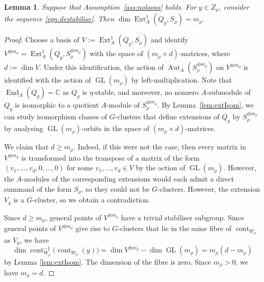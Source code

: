 \documentclass[11pt,reqno]{amsart}
\numberwithin{equation}{section}
\newtheorem{lemma}[theorem]{Lemma}
\theoremstyle{definition}
\newcommand{\CC}{\ensuremath{\mathbb{C}}}
\newcommand{\cont}{\operatorname{cont}}
\newcommand{\End}{\operatorname{End}}
\newcommand{\Ext}{\operatorname{Ext}}
\newcommand{\GL}{\operatorname{GL}}
\newcommand{\0}{\operatorname{0}}
\begin{document}
 \begin{lemma}
 \label{lem:ExtsFor0andII}
 Suppose that Assumption~\ref{ass:noloops} holds. For $y\in Z_\rho$, consider the sequence \eqref{eqn:destabilise}. Then $\dim \Ext^1_A(Q_y,S_\rho)= m_\rho$.     
 \end{lemma}
 \begin{proof}
 Choose a basis of $V:=\Ext_A^1(Q_y,S_\rho)$ and identify 
 $V^{\oplus m_\rho}=\Ext_A^1(Q_y,S_\rho^{\oplus m_\rho})$ with the space of $(m_\rho\times d)$-matrices, where $d:=\dim V$.
 Under this identification, the action of $\operatorname{Aut}_A(S_\rho^{\oplus m_\rho})$ on $V^{\oplus m_\rho}$ is identified with the action of $\GL(m_\rho)$ by left-multiplication. Note that $\End_A(Q_y)=\CC$ as $Q_y$ is $\eta$-stable, and moreover, no nonzero $A$-submodule of $Q_y$ is isomorphic to a quotient $A$-module of $S_\rho^{\oplus m_\rho}$. By Lemma~\ref{lem:extIsom}, we can study isomorphism classes of $G$-clusters that define extensions of $Q_y$ by $S_\rho^{\oplus m_\rho}$ by analysing $\GL(m_\rho)$-orbits in the space of $(m_\rho\times d)$-matrices. 
 
  We claim that $d\geq m_\rho$. Indeed, if this were not the case, then every matrix in $V^{\oplus m_\rho}$ is transformed into the transpose of a matrix of the form $(v_1,\dots,v_d,0,\dots,0)$ for some $v_1, \dots, v_d\in V$ by the action of $\GL(m_\rho)$. However, the $A$-modules of the corresponding extensions would each admit a direct summand of the form $S_\rho$, so they could not be $G$-clusters. However, the extension $V_y$ is a $G$-cluster, so we obtain a contradiction. 
   
  Since $d\ge m_\rho$, general points of $V^{\oplus m_\rho}$ have a trivial stabiliser subgroup. Since general points of $V^{\oplus m_\rho}$ give rise to $G$-clusters that lie in the same fibre of $\cont_{W_\rho}$ as $V_y$, we have
\[
\dim \cont_{W_\rho}^{-1}\big(\cont_{W_\rho}(y)\big)=\dim V^{\oplus m_\rho}-\dim \GL(m_\rho)=m_\rho(d-m_\rho)
\]
by Lemma \ref{lem:extIsom}. The dimension of the fibre is zero. Since $m_\rho>0$, we have $m_\rho = d$. 
\end{proof}
\end{document}
